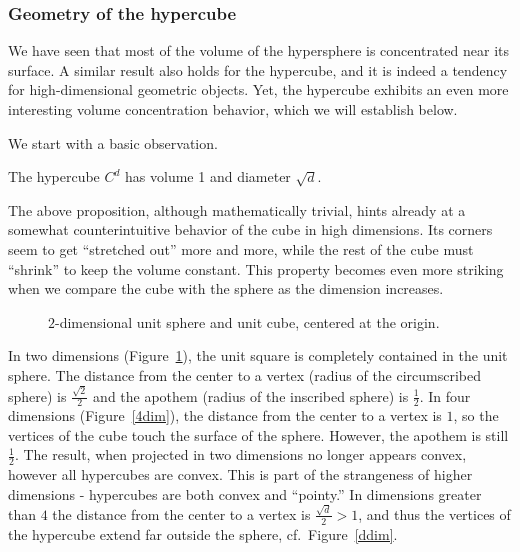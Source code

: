\subsubsection{Geometry of the hypercube} \label{ss:hypercube}

We have seen that most of the volume of the hypersphere is concentrated near its surface. A similar result also holds for the hypercube, and it is indeed a tendency for high-dimensional geometric objects. Yet, the hypercube exhibits
an even more interesting volume concentration behavior, which we will establish below.

We start with a basic observation.
\begin{proposition}
The hypercube $C^d$ has volume 1 and diameter $\sqrt{d}$.
\end{proposition}
The above proposition, although mathematically  trivial, hints already at a somewhat counterintuitive behavior of the cube in high dimensions. Its corners seem to get ``stretched out'' more and more, while the rest of the cube must ``shrink'' to keep the volume constant. This property becomes even more striking when we compare the cube with the sphere as the dimension increases.

\begin{figure}[ht!]
  \centering
  \caption{$2$-dimensional unit sphere and unit cube, centered at the origin.}
  \label{2dim}
\end{figure}

In two dimensions (Figure~\ref{2dim}), the unit square is completely contained in the unit sphere.  The distance from the center to a vertex (radius of the circumscribed sphere) is $\frac{\sqrt{2}}{2}$ and the apothem (radius of the inscribed sphere) is $\frac{1}{2}$.  In four dimensions (Figure~\ref{4dim}), the distance from the center to a vertex is $1$, so the vertices of the cube touch the surface of the sphere.  However, the apothem is still $\frac{1}{2}$.  The result, when projected in two dimensions no longer appears convex, however all hypercubes are convex.  This is part of the strangeness of higher dimensions - hypercubes are both convex and ``pointy.''  In dimensions greater than $4$ the distance from the center to a vertex is $\frac{\sqrt{d}}{2} > 1$, and thus the vertices of the hypercube extend far outside the sphere, cf.~Figure~\ref{ddim}.


